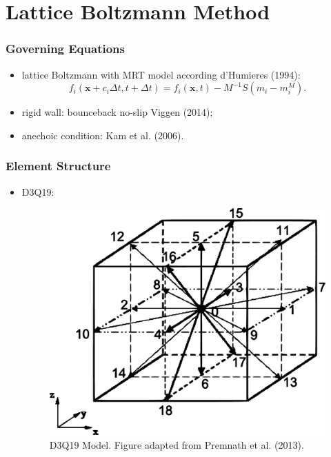 \documentclass[dvipsnames,12pt]{beamer}
\begin{document}
\section{Lattice Boltzmann Method}
\begin{frame}
\frametitle{Governing Equations}
\begin{itemize}
    \item lattice Boltzmann with MRT model according d’Humieres (1994):
    \begin{equation}
      f_{i}(\textbf{x} + c_{i}\Delta t, t + \Delta t) = f_{i}(\textbf{x}, t) -\textbf{$M$}^{-1}\textbf{$S$}(m_{i} - m_{i}^{M}).
    \label{eq:MRT_5}
    \end{equation}
    \item rigid wall: bounceback no-slip Viggen (2014);
    \item anechoic condition: Kam et al. (2006). 
\end{itemize}
\end{frame}

\begin{frame}
\frametitle{Element Structure}
\begin{itemize}
    \item D3Q19:
    \begin{figure}[ht!]
    \centering
  \includegraphics[width=.75\linewidth]{figuras/d3q19.pdf}
  \caption[Esquemático do D3Q19]{D3Q19 Model. Figure adapted from Premnath et al. (2013).}
  \label{fig:d3q19}
\end{figure} 
\end{itemize}
\end{frame}
\end{document}
